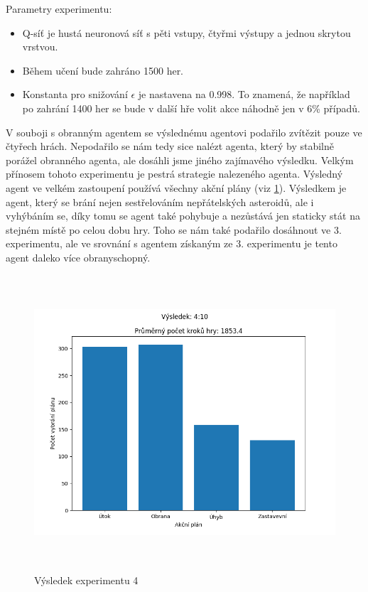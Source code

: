 Parametry experimentu:
\begin{itemize}    
    \item Q-síť je hustá neuronová síť s pěti vstupy, čtyřmi výstupy a jednou skrytou vrstvou. 
    \item Během učení bude zahráno 1500 her.
    \item Konstanta pro snižování $\epsilon$ je nastavena na 0.998. To znamená, že například po zahrání 1400 her se bude v další hře volit akce náhodně jen v 6\% případů. 
\end{itemize}

\par
V souboji s obranným agentem se výslednému agentovi podařilo zvítězit pouze ve čtyřech hrách. 
Nepodařilo se nám tedy sice nalézt agenta, který by stabilně porážel obranného agenta, ale dosáhli jsme jiného zajímavého výsledku.
Velkým přínosem tohoto experimentu je pestrá strategie nalezeného agenta. Výsledný agent ve velkém zastoupení používá všechny akční plány (viz \ref{Výsledek experimentu 04}). 
Výsledkem je agent, který se brání nejen sestřelováním nepřátelských asteroidů, ale i vyhýbáním se, díky tomu se agent také pohybuje a nezůstává jen staticky stát na stejném místě po celou dobu hry.
Toho se nám také podařilo dosáhnout ve 3. experimentu, ale ve srovnání s agentem získaným ze 3. experimentu je tento agent daleko více obranyschopný.




\begin{figure}[H]\centering
\includegraphics[width=145mm, height=110mm]{./Obrazky/Experiment04Results.png}
\caption{Výsledek experimentu 4}
\label{Výsledek experimentu 04}
\end{figure}



